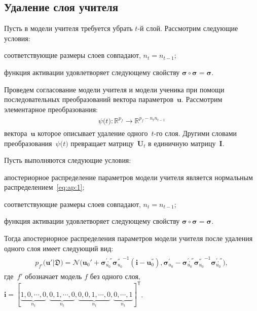 \documentclass[12pt]{a&t}
\begin{document}
\subsection{Удаление слоя учителя}
Пусть в модели учителя требуется убрать $t$-й слой. Рассмотрим следующие условия:
\begin{enumlist}
    \item соответствующие размеры слоев совпадают, $n_t=n_{t-1}$;
    \item функция активации удовлетворяет следующему свойству $\bm{\sigma} \circ \bm{\sigma} = \bm{\sigma}$.
\end{enumlist}
Проведем согласование модели учителя и модели ученика при помощи последовательных преобразований вектора параметров~$\mathbf{u}$. Рассмотрим элементарное преобразования:
\begin{gather}
\label{eq:ap:4}
\begin{aligned}
\psi\bigr(t\bigr) : \mathbb{R}^{p_f} \to \mathbb{R}^{p_f-n_tn_{t-1}}
\end{aligned}
\end{gather}
вектора~$\mathbf{u}$ которое описывает удаление одного~$t$-го слоя. Другими словами преобразования~$\psi\bigr(t\bigr)$ превращает матрицу~$\mathbf{U}_t$ в единичную матрицу~$\mathbf{I}$. 

\begin{theorem}
\label{theorem:ap:layer}
Пусть выполняются следующие условия:
\begin{enumlist}
\item апостериорное распределение параметров модели учителя является нормальным распределением~\eqref{eq:ap:1};
\item соответствующие размеры слоев совпадают, $n_t=n_{t-1}$;
\item функция активации удовлетворяет следующему свойству $\bm{\sigma} \circ \bm{\sigma} = \bm{\sigma}$.
\end{enumlist}
Тогда апостериорное распределения параметров модели учителя после удаления одного слоя имеет следующий вид:
\begin{gather}
\label{eq:ap:5}
\begin{aligned}
p_{f'}\bigr(\mathbf{u}'|\mathfrak{D}\bigr) = \mathcal{N}\bigr(\mathbf{u}_{0}'+\bm{\bm{\sigma}}_{u_0}^{', ''}{\bm{\bm{\sigma}}_{u_0}^{''}}^{-1}\left(\mathbf{i} - \mathbf{u}_0^{''}\right), \bm{\bm{\sigma}}_{u_0}^{'}-\bm{\bm{\sigma}}_{u_0}^{', ''}{\bm{\bm{\sigma}}_{u_0}^{''}}^{-1}\bm{\bm{\sigma}}_{u_0}^{', ''}\bigr),
\end{aligned}
\end{gather}
где~$f'$ обозначает модель $f$ без одного слоя, $\mathbf{i}=[\underbrace{1, 0, \cdots, 0}_{n_t}, \underbrace{0, 1, \cdots, 0}_{n_t}, \underbrace{0, 0, 1, \cdots, 0}_{n_t}, \underbrace{0, \cdots, 1}_{n_t}]^{\mathsf{T}}$.
\end{theorem}
\end{document}
